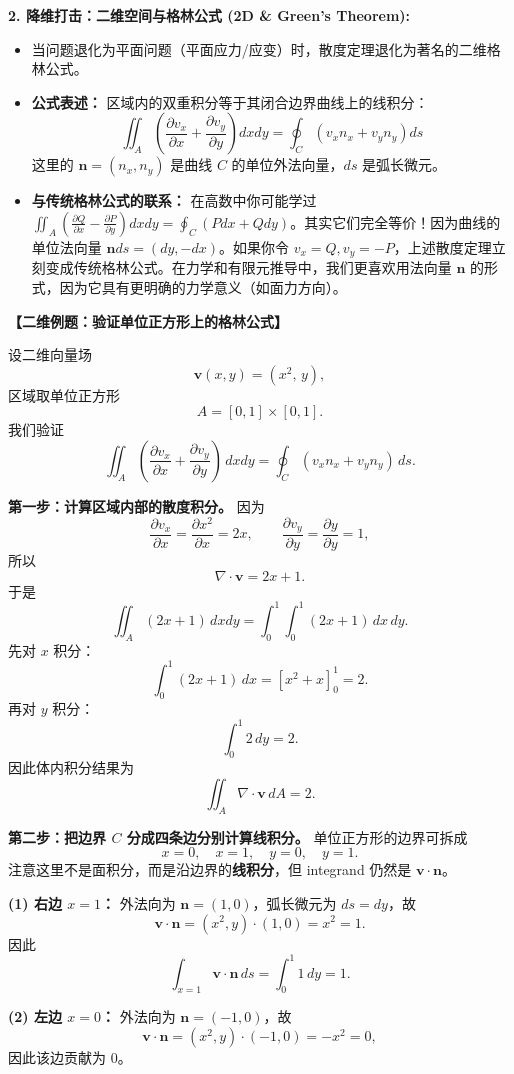 \documentclass[11pt, a4paper, UTF8]{ctexart}
\begin{document}
\textbf{2. 降维打击：二维空间与格林公式 (2D \& Green's Theorem):}
\begin{itemize}
    \item 当问题退化为平面问题（平面应力/应变）时，散度定理退化为著名的二维格林公式。
    \item \textbf{公式表述：} 区域内的双重积分等于其闭合边界曲线上的线积分：
    \[ \iint_{A} \left( \frac{\partial v_x}{\partial x} + \frac{\partial v_y}{\partial y} \right) dx dy = \oint_{C} (v_x n_x + v_y n_y) ds \]
    这里的 $\bm{n} = (n_x, n_y)$ 是曲线 $C$ 的单位外法向量，$ds$ 是弧长微元。
    \item \textbf{与传统格林公式的联系：} 在高数中你可能学过 $\iint_A (\frac{\partial Q}{\partial x} - \frac{\partial P}{\partial y}) dxdy = \oint_C (Pdx + Qdy)$。其实它们完全等价！因为曲线的单位法向量 $\bm{n} ds = (dy, -dx)$。如果你令 $v_x = Q, v_y = -P$，上述散度定理立刻变成传统格林公式。在力学和有限元推导中，我们更喜欢用法向量 $\bm{n}$ 的形式，因为它具有更明确的力学意义（如面力方向）。
\end{itemize}

\textbf{【二维例题：验证单位正方形上的格林公式】}

设二维向量场
\[
\bm{v}(x,y) = (x^2,\, y),
\]
区域取单位正方形
\[
A = [0,1]\times[0,1].
\]
我们验证
\[
\iint_A \left(\frac{\partial v_x}{\partial x}+\frac{\partial v_y}{\partial y}\right)\, dxdy
=
\oint_C (v_x n_x + v_y n_y)\, ds.
\]

\textbf{第一步：计算区域内部的散度积分。}
因为
\[
\frac{\partial v_x}{\partial x} = \frac{\partial x^2}{\partial x}=2x,
\qquad
\frac{\partial v_y}{\partial y} = \frac{\partial y}{\partial y}=1,
\]
所以
\[
\nabla\cdot\bm{v}=2x+1.
\]
于是
\[
\iint_A (2x+1)\, dxdy
=
\int_0^1\int_0^1 (2x+1)\, dx\, dy.
\]
先对 $x$ 积分：
\[
\int_0^1 (2x+1)\, dx = \left[x^2+x\right]_0^1 = 2.
\]
再对 $y$ 积分：
\[
\int_0^1 2\, dy = 2.
\]
因此体内积分结果为
\[
\iint_A \nabla\cdot\bm{v}\, dA = 2.
\]

\textbf{第二步：把边界 $C$ 分成四条边分别计算线积分。}
单位正方形的边界可拆成
\[
x=0,\quad x=1,\quad y=0,\quad y=1.
\]
注意这里不是面积分，而是沿边界的\textbf{线积分}，但 integrand 仍然是 $\bm{v}\cdot\bm{n}$。

\textbf{(1) 右边 $x=1$：}
外法向为 $\bm{n}=(1,0)$，弧长微元为 $ds=dy$，故
\[
\bm{v}\cdot\bm{n} = (x^2,y)\cdot(1,0)=x^2=1.
\]
因此
\[
\int_{x=1} \bm{v}\cdot\bm{n}\, ds
=
\int_0^1 1\, dy = 1.
\]

\textbf{(2) 左边 $x=0$：}
外法向为 $\bm{n}=(-1,0)$，故
\[
\bm{v}\cdot\bm{n} = (x^2,y)\cdot(-1,0) = -x^2 = 0,
\]
因此该边贡献为 0。
\end{document}

